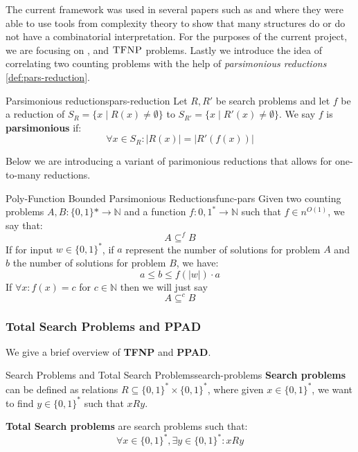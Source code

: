 The current framework was used in several papers such as
\cite{ikenmeyer_WhatWhatNot_2022} and \cite{ikenmeyer_PositivitySymmetricGroup_2024}
where they were able to use tools from complexity theory to show that
many structures do or do not have a combinatorial interpretation.
For the purposes of the current project, we are focusing on \cite{ikenmeyer_WhatWhatNot_2022},
and $\textsc{TFNP}$ problems.
Lastly we introduce the idea of correlating two counting problems with the help of
\textit{parsimonious reductions} \ref{def:pars-reduction}.


\begin{definitionbox}{Parsimonious reductions}{pars-reduction}
    Let $R, R'$ be search problems and let $f$ be a reduction of
    $S_R = \{x \mid R(x) \neq \emptyset \}$ to $S_{R'} = \{x \mid R'(x) \neq \emptyset \}$.
    We say $f$ is \textbf{parsimonious} if:
    $$
    \forall x \in S_R : |R(x)| = |R'(f(x))|
    $$ 
\end{definitionbox}

Below we are introducing a variant of parimonious reductions that allows
for one-to-many reductions. 
\begin{definitionbox}{Poly-Function Bounded Parsimonious Reductions}{func-pars}
    Given two counting problems $A, B : \{0,1\}* \to \mathbb{N}$
    and a function $f : {0,1}^{*} \to \mathbb{N}$ such that $f \in n^{O(1)}$, we
    say that:
    $$
    A \subseteq^f B
    $$
    If for input $w \in \{0,1\}^*$, if $a$ represent the number of solutions
    for problem $A$ and $b$ the number of solutions for problem $B$, we have:
    $$
    a \leq b \leq f(|w|) \cdot a
    $$
    If $\forall x : f(x) = c$ for $c \in \mathbb{N}$ then we will just say 
    $$
    A \subseteq^c B
    $$
\end{definitionbox}

\subsubsection{Total Search Problems and PPAD}
We give a brief overview of \textbf{TFNP} and \textbf{PPAD}.


\begin{definitionbox}{Search Problems and Total Search Problems}{search-problems}
    \textbf{Search problems} can be defined as relations $R \subseteq \{0,1\}^* \times \{0,1\}^*$,
    where given $x \in \{0,1\}^*$, we want to find $y \in \{0,1\}^*$  such that $x Ry$.

    \textbf{Total Search problems} are search problems such that:
    $$
    \forall x \in \{0,1\}^*, \exists y \in \{0,1\}^* : xRy
    $$
\end{definitionbox}


